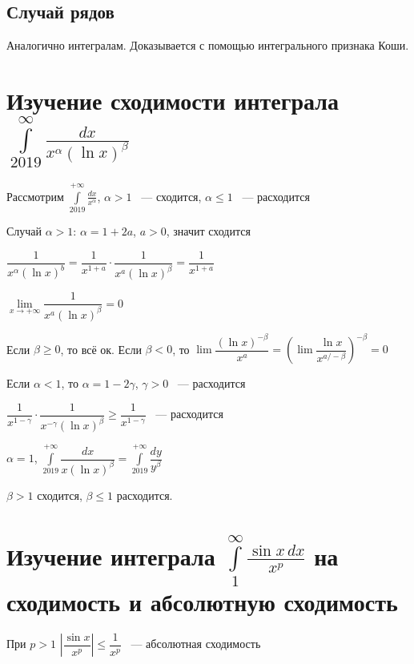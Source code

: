 \documentclass{article}
\begin{document}
        \subsection{Случай рядов}
            
            Аналогично интегралам. Доказывается с помощью интегрального признака Коши.
            
    \newpage
    
    \section{Изучение сходимости интеграла $\int\limits_{2019}^{\infty}\frac{dx}{x^{\alpha}(\ln x)^{\beta}}$}
    
        Рассмотрим $\int\limits^{+\infty}_{2019} \frac{dx}{x^{\alpha}}$, $\alpha > 1$ ~--- сходится, $\alpha \leq 1$ ~--- расходится
        
        Случай $\alpha > 1$: $\alpha = 1 + 2a$, $a > 0$, значит сходится
        
        $\dfrac{1}{x^{\alpha} (\ln {x})^b} = \dfrac{1}{x^{1 + a}} \cdot \dfrac{1}{x^a(\ln{x})^{\beta}} = \dfrac{1}{x^{1 + a}}$
        
        $\lim\limits_{x \rightarrow +\infty} \dfrac{1}{x^a (\ln{x})^{\beta}} = 0$
        
        Если $\beta \geq 0$, то всё ок. Если $\beta < 0$, то $\lim \dfrac{(\ln{x})^{-\beta}}{x^a} = \left( \lim \dfrac{\ln{x}}{x^{a / -\beta}} \right)^{-\beta} = 0$
        
        Если $\alpha < 1$, то $\alpha = 1 - 2 \gamma$, $\gamma > 0$ ~--- расходится
        
        $\dfrac{1}{x^{1 - \gamma}} \cdot \dfrac{1}{x^{-\gamma}(\ln{x})^{\beta}} \geq \dfrac{1}{x^{1 - \gamma}}$ ~--- расходится
        
        $\alpha = 1$, $\int\limits^{+\infty}_{2019} \dfrac{dx}{x(\ln{x})^{\beta}} = \int\limits^{+\infty}_{2019} \dfrac{dy}{y^{\beta}}$
        
        $\beta > 1$ сходится, $\beta \leq 1$ расходится.
        
    \newpage
    
    \section{Изучение интеграла $\int\limits_1^{\infty} \frac{\sin x\,dx}{x^p}$ на сходимость и абсолютную сходимость}
    
        При $p > 1$ $\left| \dfrac{\sin{x}}{x^p} \right| \leq \dfrac{1}{x^p}$ ~--- абсолютная сходимость
        
\end{document}
